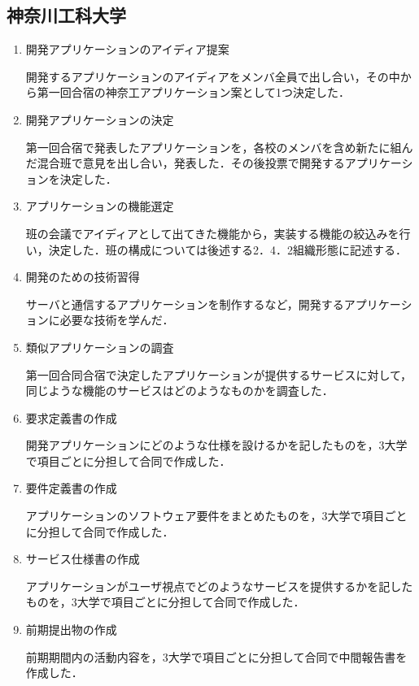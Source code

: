 \subsection{神奈川工科大学}
\begin{enumerate}
\item 開発アプリケーションのアイディア提案
\par 開発するアプリケーションのアイディアをメンバ全員で出し合い，その中から第一回合宿の神奈工アプリケーション案として1つ決定した．
\item 開発アプリケーションの決定
\par 第一回合宿で発表したアプリケーションを，各校のメンバを含め新たに組んだ混合班で意見を出し合い，発表した．その後投票で開発するアプリケーションを決定した．
\item アプリケーションの機能選定
\par 班の会議でアイディアとして出てきた機能から，実装する機能の絞込みを行い，決定した．班の構成については後述する2．4．2組織形態に記述する．
\item 開発のための技術習得
\par サーバと通信するアプリケーションを制作するなど，開発するアプリケーションに必要な技術を学んだ．
\item 類似アプリケーションの調査
\par 第一回合同合宿で決定したアプリケーションが提供するサービスに対して，同じような機能のサービスはどのようなものかを調査した．
\item 要求定義書の作成
\par 開発アプリケーションにどのような仕様を設けるかを記したものを，3大学で項目ごとに分担して合同で作成した．
\item 要件定義書の作成
\par アプリケーションのソフトウェア要件をまとめたものを，3大学で項目ごとに分担して合同で作成した．
\item サービス仕様書の作成
\par アプリケーションがユーザ視点でどのようなサービスを提供するかを記したものを，3大学で項目ごとに分担して合同で作成した．
\item 前期提出物の作成
\par 前期期間内の活動内容を，3大学で項目ごとに分担して合同で中間報告書を作成した．
\end{enumerate}

